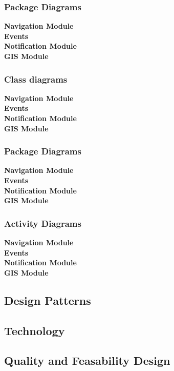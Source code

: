 \documentclass[a4paper,12pt]{report}
\begin{document}
\subsubsection{Package Diagrams}
\textbf{Navigation Module} \\
\textbf{Events}\\
\textbf{Notification Module}\\
\textbf{GIS Module}
\subsubsection{Class diagrams}
\textbf{Navigation Module}\\
\textbf{Events}\\
\textbf{Notification Module}\\
\textbf{GIS Module}
\subsubsection{Package Diagrams}
\textbf{Navigation Module}\\
\textbf{Events}\\
\textbf{Notification Module}\\
\textbf{GIS Module}
\subsubsection{Activity Diagrams}
\textbf{Navigation Module}\\
\textbf{Events}\\
\textbf{Notification Module}\\
\textbf{GIS Module}\\

\newpage
\subsection{Design Patterns}
\newpage
\subsection{Technology}
\newpage
\subsection{Quality and Feasability Design}
\end{document}
